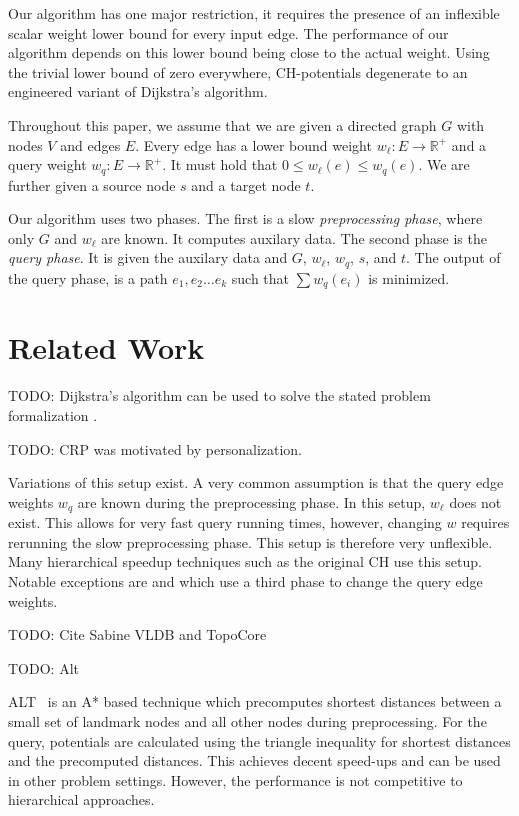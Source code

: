 \documentclass[a4paper,UKenglish,cleveref, autoref]{lipics-v2019}
\begin{document}
Our algorithm has one major restriction, it requires the presence of an inflexible scalar weight lower bound for every input edge.
The performance of our algorithm depends on this lower bound being close to the actual weight.
Using the trivial lower bound of zero everywhere, CH-potentials degenerate to an engineered variant of Dijkstra's algorithm.

Throughout this paper, we assume that we are given a directed graph $G$ with nodes $V$ and edges $E$.
Every edge has a lower bound weight $w_\ell:E\rightarrow \mathbb{R}^+$ and a query weight $w_q:E\rightarrow \mathbb{R}^+$.
It must hold that $0\le w_\ell(e)\le w_q(e)$.
We are further given a source node $s$ and a target node $t$.


Our algorithm uses two phases.
The first is a slow \emph{preprocessing phase}, where only $G$ and $w_\ell$ are known.
It computes auxilary data.
The second phase is the \emph{query phase}.
It is given the auxilary data and $G$, $w_\ell$, $w_q$, $s$, and $t$.
The output of the query phase, is a path $e_1,e_2\ldots e_k$ such that $\sum w_q(e_i)$ is minimized.

\section{Related Work}

TODO: Dijkstra's algorithm \cite{Dijkstra's} can be used to solve the stated problem formalization \cite{Veit?}.

TODO: CRP was motivated by personalization.

Variations of this setup exist.
A very common assumption is that the query edge weights $w_q$ are known during the preprocessing phase.
In this setup, $w_\ell$ does not exist.
This allows for very fast query running times, however, changing $w$ requires rerunning the slow preprocessing phase.
This setup is therefore very unflexible.
Many hierarchical speedup techniques such as the original CH \cite{CH} use this setup.
Notable exceptions are \cite{MLD,CRP} and \cite{CCH} which use a third phase to change the query edge weights.


TODO: Cite Sabine VLDB and TopoCore

TODO: Alt

ALT~\cite{gh-cspas-05} is an A* based technique which precomputes shortest distances between a small set of landmark nodes and all other nodes during preprocessing.
For the query, potentials are calculated using the triangle inequality for shortest distances and the precomputed distances.
This achieves decent speed-ups and can be used in other problem settings.
However, the performance is not competitive to hierarchical approaches.
\end{document}

